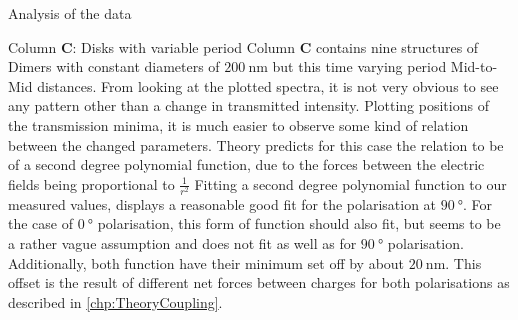 \documentclass[pdftex, a4paper,11pt, twoside, UKenglish]{report}
\begin{document}
\begin{chapter}{Analysis of the data}
    \newpage
    \begin{section}{Column \textbf{C}: Disks with variable period}
      \label{chp:DataC}
      Column \textbf{C} contains nine structures of Dimers with constant
      diameters of $\SI{200}{\nano\meter}$ but this time varying period
      Mid-to-Mid distances.
      From looking at the plotted spectra, it is not very obvious to see any
      pattern other than a change in transmitted intensity.
      Plotting positions of the transmission minima, it is much easier to
      observe some kind of relation between the changed parameters.\newline
      Theory predicts for this case the relation to be of a second degree 
      polynomial function, due to the forces between the electric fields being
      proportional to $\frac{1}{r^{2}}$
      Fitting a second degree polynomial function to our measured values, 
      displays a reasonable good fit for the polarisation at $\SI{90}{\degree}$.
      For the case of $\SI{0}{\degree}$ polarisation, this form of function
      should also fit, but seems to be a rather vague assumption and does not
      fit as well as for $\SI{90}{\degree}$ polarisation.
      Additionally, both function have their minimum set off by about
      $\SI{20}{\nano\meter}$. This offset is the result of different net forces
      between charges for both polarisations as described in
      \cref{chp:TheoryCoupling}.
      

\end{section}
\end{chapter}
\end{document}
